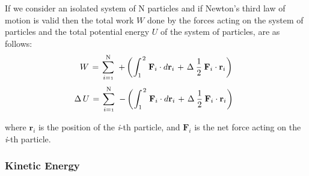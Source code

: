 \documentclass[10pt]{article}
\newcommand{\mW}{W}
\newcommand{\mU}{U}
\newcommand{\ri}{_i}
\newcommand{\vR}{\mathbf{r}}
\newcommand{\vF}{\mathbf{F}}
\begin{document}
\par If we consider an isolated system of N particles and if Newton's third law of motion is valid then the total work $\mW$ done by the forces acting on the system of particles and the total potential energy $\mU$ of the system of particles, are as follows:
\medskip
\begin{eqnarray*}
\mW \hspace{+0.12em} = \hspace{+0.12em} \sum_{i={\scriptscriptstyle 1}}^{\mathrm N} \hspace{+0.36em} + \left( \hspace{+0.06em} \int_1^{\hspace{+0.09em} 2} \hspace{+0.12em} \vF\ri \cdot d\vR\ri \hspace{+0.12em} + \hspace{+0.12em} \Delta \hspace{+0.24em} \frac{1}{2} \hspace{+0.24em} \vF\ri \cdot \vR\ri \hspace{+0.06em} \right)
\end{eqnarray*}
\begin{eqnarray*}
\hspace{-0.60em} \Delta \hspace{+0.18em} \mU \hspace{+0.12em} = \hspace{+0.12em} \sum_{i={\scriptscriptstyle 1}}^{\mathrm N} \hspace{+0.36em} - \left( \hspace{+0.06em} \int_1^{\hspace{+0.09em} 2} \hspace{+0.12em} \vF\ri \cdot d\vR\ri \hspace{+0.12em} + \hspace{+0.12em} \Delta \hspace{+0.24em} \frac{1}{2} \hspace{+0.24em} \vF\ri \cdot \vR\ri \hspace{+0.06em} \right)
\end{eqnarray*}
\smallskip
\par \noindent where $\vR\ri$ is the position of the \textit{i}-th particle, and $\vF\ri$ is the net force acting on the \textit{i}-th particle.

\vspace{+1.50em}

{\centering\subsubsection*{Kinetic Energy}}
\end{document}
